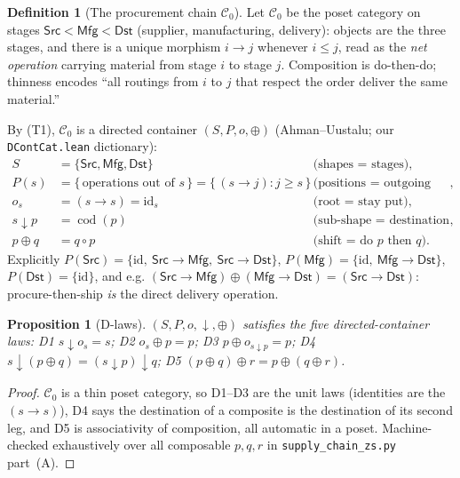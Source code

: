 \documentclass[11pt]{article}
\newtheorem{proposition}[theorem]{Proposition}
\theoremstyle{definition}
\newtheorem{definition}[theorem]{Definition}
\newcommand{\id}{\mathrm{id}}
\newcommand{\C}{\mathcal{C}}
\newcommand{\cod}{\operatorname{cod}}
\begin{document}
\begin{definition}[The procurement chain $\C_0$]
Let $\C_0$ be the poset category on stages $\mathsf{Src}<\mathsf{Mfg}<\mathsf{Dst}$
(supplier, manufacturing, delivery): objects are the three stages, and there is a
unique morphism $i\to j$ whenever $i\le j$, read as the \emph{net operation} carrying
material from stage $i$ to stage $j$. Composition is do-then-do; thinness encodes
``all routings from $i$ to $j$ that respect the order deliver the same material.''
\end{definition}

By (T1), $\C_0$ is a directed container $(S,P,o,\oplus)$
(Ahman--Uustalu; our \texttt{DContCat.lean} dictionary):
\[
\begin{aligned}
S &= \{\mathsf{Src},\mathsf{Mfg},\mathsf{Dst}\} && \text{(shapes = stages)},\\
P(s) &= \{\,\text{operations out of }s\,\}=\{\,(s\to j):j\ge s\,\}
   && \text{(positions = outgoing operations)},\\
o_s &= (s\to s)=\id_s && \text{(root = stay put)},\\
s\!\downarrow\! p &= \cod(p) && \text{(sub-shape = destination stage)},\\
p\oplus q &= q\circ p && \text{(shift = do }p\text{ then }q).
\end{aligned}
\]
Explicitly $P(\mathsf{Src})=\{\id,\ \mathsf{Src}\!\to\!\mathsf{Mfg},\
\mathsf{Src}\!\to\!\mathsf{Dst}\}$, $P(\mathsf{Mfg})=\{\id,\
\mathsf{Mfg}\!\to\!\mathsf{Dst}\}$, $P(\mathsf{Dst})=\{\id\}$, and e.g.
$(\mathsf{Src}\!\to\!\mathsf{Mfg})\oplus(\mathsf{Mfg}\!\to\!\mathsf{Dst})
=(\mathsf{Src}\!\to\!\mathsf{Dst})$: procure-then-ship \emph{is} the direct delivery
operation.

\begin{proposition}[D-laws]\label{prop:dlaws}
$(S,P,o,\downarrow,\oplus)$ satisfies the five directed-container laws:
D1 $s\!\downarrow\! o_s=s$; D2 $o_s\oplus p=p$; D3 $p\oplus o_{s\downarrow p}=p$;
D4 $s\!\downarrow\!(p\oplus q)=(s\!\downarrow\! p)\!\downarrow\! q$; D5
$(p\oplus q)\oplus r=p\oplus(q\oplus r)$.
\end{proposition}
\begin{proof}
$\C_0$ is a thin poset category, so D1--D3 are the unit laws (identities are the
$(s\to s)$), D4 says the destination of a composite is the destination of its second
leg, and D5 is associativity of composition, all automatic in a poset. Machine-checked
exhaustively over all composable $p,q,r$ in \texttt{supply\_chain\_zs.py} part~(A).
\end{proof}
\end{document}

